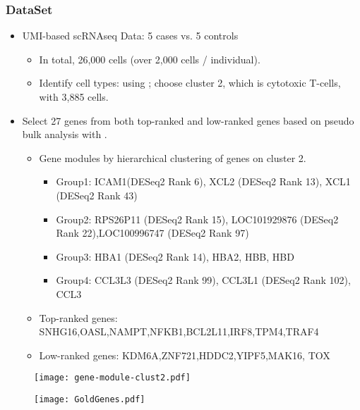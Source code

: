 \begin{frame}
  \frametitle{DataSet}
  \begin{itemize}
  \item
    UMI-based scRNAseq Data: 5 cases vs. 5 controls
    \begin{itemize}
    \item
      In total, 26,000 cells (over 2,000 cells / individual).
    \item
      Identify cell types: using ; choose cluster 2, which is
      cytotoxic T-cells, with 3,885 cells.
    \end{itemize}
  \item
    Select 27 genes from both top-ranked and low-ranked genes based on pseudo
    bulk analysis with .
    \begin{itemize}
    \item
      Gene modules by hierarchical clustering of genes
      on cluster 2.
    \begin{itemize}
    \item
      Group1: ICAM1(DESeq2 Rank 6), XCL2 (DESeq2 Rank 13), XCL1 (DESeq2 Rank 43)
    \item
      Group2: RPS26P11 (DESeq2 Rank 15), LOC101929876 (DESeq2 Rank 22),LOC100996747 (DESeq2 Rank 97)
    \item
      Group3: HBA1 (DESeq2 Rank 14), HBA2, HBB, HBD 
    \item
      Group4: CCL3L3 (DESeq2 Rank 99), CCL3L1 (DESeq2 Rank 102), CCL3
    \end{itemize}
  \item
    Top-ranked genes: SNHG16,OASL,NAMPT,NFKB1,BCL2L11,IRF8,TPM4,TRAF4
  \item
    Low-ranked genes: KDM6A,ZNF721,HDDC2,YIPF5,MAK16, TOX
    \end{itemize}
  \end{itemize}
\end{frame}

\begin{frame}
\begin{figure}
  \centering
  \texttt{[image: gene-module-clust2.pdf]}
\end{figure}
\end{frame}

\begin{frame}
  \begin{figure}
    \centering
    \texttt{[image: GoldGenes.pdf]}
  \end{figure}
\end{frame}

